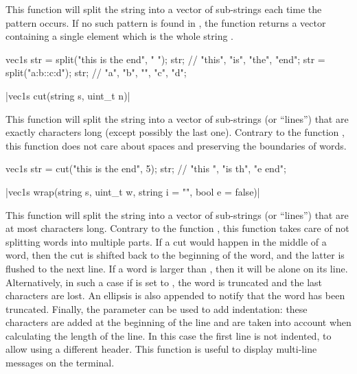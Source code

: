 This function will split the string  into a vector of sub-strings each time the pattern  occurs. If no such pattern is found in , the function returns a vector containing a single element which is the whole string .

\begin{example}
\begin{cppcode}
vec1s str = split("this is the end", " ");
str; // {"this", "is", "the", "end"};
str = split("a:b::c:d");
str; // {"a", "b", "", "c", "d"};
\end{cppcode}
\end{example}

\item \cppinline|vec1s cut(string s, uint_t n)| 

This function will split the string  into a vector of sub-strings (or ``lines'') that are exactly  characters long (except possibly the last one). Contrary to the function , this function does not care about spaces and preserving the boundaries of words.

\begin{example}
\begin{cppcode}
vec1s str = cut("this is the end", 5);
str; // {"this ", "is th", "e end"};
\end{cppcode}
\end{example}

\item \cppinline|vec1s wrap(string s, uint_t w, string i = "", bool e = false)| 

This function will split the string  into a vector of sub-strings (or ``lines'') that are at most  characters long. Contrary to the function , this function takes care of not splitting words into multiple parts. If a cut would happen in the middle of a word, then the cut is shifted back to the beginning of the word, and the latter is flushed to the next line. If a word is larger than , then it will be alone on its line. Alternatively, in such a case if  is set to , the word is truncated and the last characters are lost. An ellipsis  is also appended to notify that the word has been truncated. Finally, the parameter  can be used to add indentation: these characters are added at the beginning of the line and are taken into account when calculating the length of the line. In this case the first line is not indented, to allow using a different header. This function is useful to display multi-line messages on the terminal.

